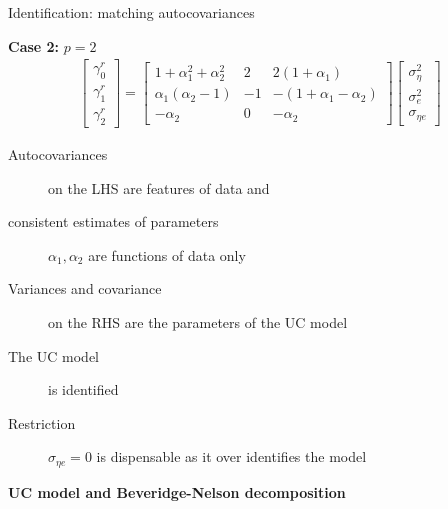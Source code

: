 \documentclass[notes,blackandwhite,mathsans,usenames,dvipsnames]{beamer}
\begin{document}
\begin{frame}{Identification: matching autocovariances}

\textbf{Case 2:} $p=2$ 
\begin{align*}
\begin{bmatrix} \gamma^r_0 \\ \gamma^r_1 \\ \gamma^r_2 \end{bmatrix} = 
\begin{bmatrix} 1+\alpha_1^2+\alpha_2^2 & 2 & 2(1+\alpha_1) \\  \alpha_1(\alpha_2-1) & -1 & -(1+\alpha_1 -\alpha_2) \\ -\alpha_2 & 0 & -\alpha_2 \end{bmatrix}
\begin{bmatrix} \sigma^2_\eta \\ \sigma^2_e \\ \sigma_{\eta e} \end{bmatrix}
\end{align*}

\begin{description}
\item[Autocovariances] {\color{mcxs2}on the LHS are features of data and }
\item[consistent estimates of parameters] $\alpha_1, \alpha_2$ {\color{mcxs2}are functions of data only}
\item[Variances and covariance] {\color{mcxs2}on the RHS are the parameters of the UC model}
\item[The UC model] {\color{mcxs2}is} {\color{purple}identified}
\item[Restriction] $\sigma_{\eta e}=0$ {\color{mcxs2}is dispensable as it over identifies the model}
\end{description}

\end{frame}





{
\begin{frame}

\begin{adjustwidth}{-0.5cm}{0cm}
\vspace{8.3cm}\Large
\textbf{{\color{lightgray}UC model and} {\color{white}Beveridge-Nelson decomposition}}
\end{adjustwidth}

\end{frame}
}
\end{document}
